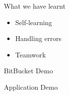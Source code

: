 \documentclass{beamer}
\begin{document}
\begin{frame}{\huge What we have learnt}
\begin{itemize}
\item Self-learning
\item Handling errors 
\item Teamwork
\end{itemize}
\end{frame}

\begin{frame}
\begin{center}
BitBucket Demo
\end{center}
\end{frame}

\begin{frame}
\begin{center}
Application Demo
\end{center}
\end{frame}
\end{document}
